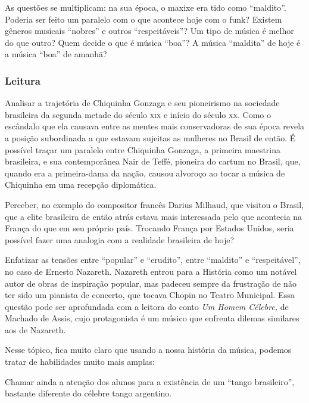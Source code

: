 \documentclass[11pt]{extarticle}
\begin{document}
As questões se multiplicam: na sua época, o maxixe era tido como
``maldito''. Poderia ser feito um paralelo com o que acontece hoje com o
funk? Existem gêneros musicais ``nobres'' e outros ``respeitáveis''? Um
tipo de música é melhor do que outro? Quem decide o que é música
``boa''? A música ``maldita'' de hoje é a música ``boa'' de amanhã?

\subsubsection{Leitura}

Analisar a trajetória de Chiquinha Gonzaga e seu pioneirismo na
sociedade brasileira da segunda metade do século \textsc{xix} e início do século
\textsc{xx}. Como o escândalo que ela causava entre as mentes mais conservadoras
de sua época revela a posição subordinada a que estavam sujeitas as
mulheres no Brasil de então. É possível traçar um paralelo entre
Chiquinha Gonzaga, a primeira maestrina brasileira, e sua contemporânea
Nair de Teffé, pioneira do cartum no Brasil, que, quando era a
primeira-dama da nação, causou alvoroço ao tocar a música de Chiquinha
em uma recepção diplomática.


Perceber, no exemplo do compositor francês Darius Milhaud, que visitou o
Brasil, que a elite brasileira de então atrás estava mais interessada
pelo que acontecia na França do que em seu próprio país. Trocando França
por Estados Unidos, seria possível fazer uma analogia com a realidade
brasileira de hoje?

Enfatizar as tensões entre ``popular'' e ``erudito'', entre ``maldito''
e ``respeitável'', no caso de Ernesto Nazareth. Nazareth entrou para a
História como um notável autor de obras de inspiração popular, mas
padeceu sempre da frustração de não ter sido um pianista de concerto,
que tocava Chopin no Teatro Municipal. Essa questão pode ser aprofundada
com a leitora do conto \emph{Um Homem Célebre,} de Machado de Assis,
cujo protagonista é um músico que enfrenta dilemas similares aos de
Nazareth.

Nesse tópico, fica muito claro que usando a nossa história da música, podemos tratar de habilidades muito mais amplas:


Chamar ainda a atenção dos alunos para a existência de um ``tango
brasileiro'', bastante diferente do célebre tango argentino.
\end{document}
